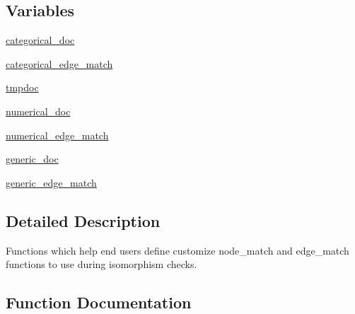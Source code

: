 \subsection*{Variables}
\begin{DoxyCompactItemize}
\item 
\hyperlink{namespacenetworkx_1_1algorithms_1_1isomorphism_1_1matchhelpers_a00aa944f584c0e6960177cd43db11615}{categorical\+\_\+doc}
\item 
\hyperlink{namespacenetworkx_1_1algorithms_1_1isomorphism_1_1matchhelpers_a514bca1612e4ee443796b864202e10e1}{categorical\+\_\+edge\+\_\+match}
\item 
\hyperlink{namespacenetworkx_1_1algorithms_1_1isomorphism_1_1matchhelpers_a979615a66b4e48b66acc07acc12eefe4}{tmpdoc}
\item 
\hyperlink{namespacenetworkx_1_1algorithms_1_1isomorphism_1_1matchhelpers_a39b9a04f89dc319c8c44a26697f020c7}{numerical\+\_\+doc}
\item 
\hyperlink{namespacenetworkx_1_1algorithms_1_1isomorphism_1_1matchhelpers_a89fd26c87dca5f68cf4476d6177206c4}{numerical\+\_\+edge\+\_\+match}
\item 
\hyperlink{namespacenetworkx_1_1algorithms_1_1isomorphism_1_1matchhelpers_a6d9fcdab5e01f5ff28b76e58b6df7437}{generic\+\_\+doc}
\item 
\hyperlink{namespacenetworkx_1_1algorithms_1_1isomorphism_1_1matchhelpers_a8111c8e3b0efe7895ef270c31f3c77fb}{generic\+\_\+edge\+\_\+match}
\end{DoxyCompactItemize}


\subsection{Detailed Description}
\begin{DoxyVerb}Functions which help end users define customize node_match and
edge_match functions to use during isomorphism checks.
\end{DoxyVerb}
 

\subsection{Function Documentation}
\mbox{\label{namespacenetworkx_1_1algorithms_1_1isomorphism_1_1matchhelpers_af7edc13daad9ab9f573fff1c67173d90}} 
